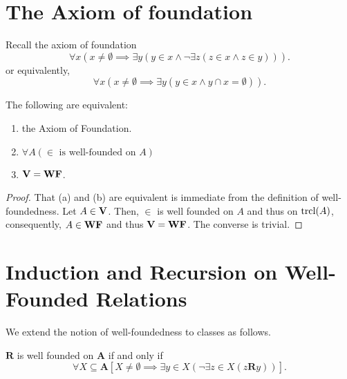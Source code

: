 \section{The Axiom of foundation}

Recall the axiom of foundation 
\begin{equation*}
    \forall x\left(x\ne\emptyset\implies\exists y\left(y\in x\wedge\neg\exists z\left(z\in x\wedge z\in y\right)\right)\right).
\end{equation*}
or equivalently, 
\begin{equation*}
    \forall x\left(x\ne\emptyset\implies\exists y\left(y\in x\wedge y\cap x = \emptyset\right)\right).
\end{equation*}

\begin{theorem}
    The following are equivalent:
    \begin{enumerate}[label=(\alph*)]
        \item the Axiom of Foundation. 
        \item $\forall A(\in\text{ is well-founded on }A)$
        \item $\mathbf{V} = \mathbf{WF}$.
    \end{enumerate}
\end{theorem}
\begin{proof}
    That (a) and (b) are equivalent is immediate from the definition of well-foundedness. Let $A\in\mathbf{V}$. Then, $\in$ is well founded on $A$ and thus on $\operatorname{tr cl}(A)$, consequently, $A\in\mathbf{WF}$ and thus $\mathbf{V} = \mathbf{WF}$. The converse is trivial.
\end{proof}


\section{Induction and Recursion on Well-Founded Relations}

We extend the notion of well-foundedness to classes as follows. 
\begin{definition}
    $\mathbf R$ is well founded on $\mathbf A$ if and only if 
    \begin{equation*}
        \forall X\subseteq\mathbf A\left[X\ne\emptyset\implies\exists y\in X\left(\neg\exists z\in X(z\mathbf R y)\right)\right].
    \end{equation*}
\end{definition}

